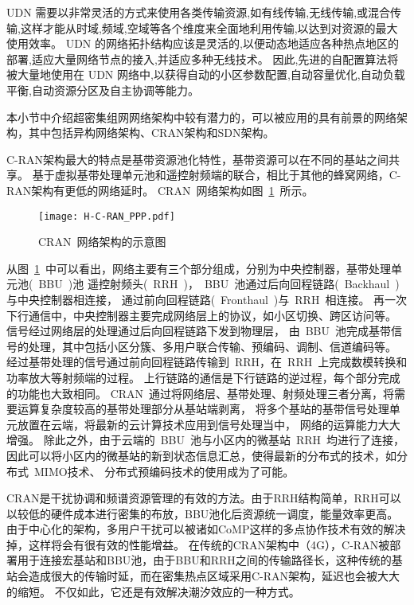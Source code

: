 UDN 需要以非常灵活的方式来使用各类传输资源,如有线传输,无线传输,或混合传输,这样才能从时域,频域,空域等各个维度来全面地利用传输,以达到对资源的最大使用效率。
UDN 的网络拓扑结构应该是灵活的,以便动态地适应各种热点地区的部署,适应大量网络节点的接入,并适应多种无线技术。
因此,先进的自配置算法将被大量地使用在 UDN 网络中,以获得自动的小区参数配置,自动容量优化,自动负载平衡,自动资源分区及自主协调等能力。

本小节中介绍超密集组网网络架构中较有潜力的，可以被应用的具有前景的网络架构，其中包括异构网络架构、CRAN架构和SDN架构。

C-RAN架构最大的特点是基带资源池化特性，基带资源可以在不同的基站之间共享。
基于虚拟基带处理单元池和遥控射频端的联合，相比于其他的蜂窝网络，C-RAN架构有更低的网络延时。
CRAN~网络架构如图~\ref{CRAN}~所示。
\begin{figure}[htbp]
\centering
\texttt{[image: H-C-RAN\_PPP.pdf]}
\caption{CRAN~网络架构的示意图}\vspace{-1.5em}
\label{CRAN}
\end{figure}
从图~\ref{CRAN}~中可以看出，网络主要有三个部分组成，分别为中央控制器，基带处理单元池(~BBU~)池
遥控射频头(~RRH~)，~BBU~池通过后向回程链路(~Backhaul~)与中央控制器相连接，
通过前向回程链路(~Fronthaul~)与~RRH~相连接。
再一次下行通信中，中央控制器主要完成网络层上的协议，如小区切换、跨区访问等。
信号经过网络层的处理通过后向回程链路下发到物理层，
由~BBU~池完成基带信号的处理，其中包括小区分簇、多用户联合传输、预编码、调制、信道编码等。
经过基带处理的信号通过前向回程链路传输到~RRH，在~RRH~上完成数模转换和功率放大等射频端的过程。
上行链路的通信是下行链路的逆过程，每个部分完成的功能也大致相同。
CRAN~通过将网络层、基带处理、射频处理三者分离，将需要运算复杂度较高的基带处理部分从基站端剥离，
将多个基站的基带信号处理单元放置在云端，将最新的云计算技术应用到信号处理当中，
网络的运算能力大大增强。
除此之外，由于云端的~BBU~池与小区内的微基站~RRH~均进行了连接，
因此可以将小区内的微基站的新到状态信息汇总，使得最新的分布式的技术，如分布式~MIMO技术、
分布式预编码技术的使用成为了可能。

CRAN是干扰协调和频谱资源管理的有效的方法。由于RRH结构简单，RRH可以以较低的硬件成本进行密集的布放，BBU池化后资源统一调度，能量效率更高。
由于中心化的架构，多用户干扰可以被诸如CoMP这样的多点协作技术有效的解决掉，这样将会有很有效的性能增益。
在传统的CRAN架构中（4G），C-RAN被部署用于连接宏基站和BBU池，由于BBU和RRH之间的传输路径长，这种传统的基站会造成很大的传输时延，而在密集热点区域采用C-RAN架构，延迟也会被大大的缩短。
不仅如此，它还是有效解决潮汐效应的一种方式。

